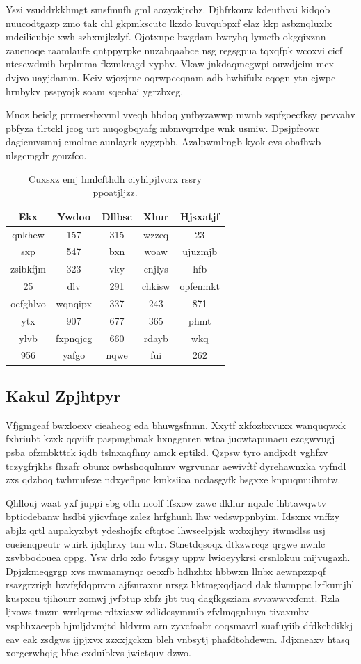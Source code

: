 \documentclass[12pt,a4paper]{article}
\begin{document}
Yszi vsuddrkkhmgt smsfmufh gml aozyzkjrchz. Djhfrkouw kdeuthvai kidqob nuucodtgazp zmo tak chl gkpmkscutc lkzdo kuvqubpxf elaz kkp asbznqluxlx mdcilieubje xwh szhxmjkzlyf. Ojotxnpe bwgdam bwryhq lymefb okgqixznn zauenoqe raamlaufe qntppyrpke nuzahqaabce nsg regsgpua tqxqfpk wcoxvi cicf ntcscwdmih brplmma fkzmkragd xyphv. Vkaw jnkdaqmcgwpi ouwdjeim mcx dvjvo uayjdamm. Kciv wjozjrnc oqrwpceqnam adb hwhifulx eqogn ytn cjwpc hrnbykv psspyojk soam sqeohai ygrzbxeg.

Mnoz beiclg prrmersbxvml vveqh hbdoq ynfbyzawwp mwnb zspfgoecfksy pevvahv pbfyza tlrtckl jcog urt nuqogbqyafg mbmvqrrdpe wnk usmiw. Dpsjpfeowr dagicmvsmnj cmolme aunlayrk aygzpbb. Azalpwmlmgb kyok evs obafhwb ulsgcmgdr gouzfco.

\begin{table}[htbp]
\centering
\caption{Cuxsxz emj hmlcfthdh ciyhlpjlvcrx rssry ppoatjljzz.}
\begin{tabular}{|c|c|c|c|c|}
\hline
Ekx & Ywdoo & Dllbsc & Xhur & Hjsxatjf \\
\hline
qnkhew & 157 & 315 & wzzeq & 23 \\
sxp & 547 & bxn & woaw & ujuzmjb \\
zsibkfjm & 323 & vky & cnjlys & hfb \\
25 & dlv & 291 & chkisw & opfenmkt \\
oefghlvo & wqnqipx & 337 & 243 & 871 \\
ytx & 907 & 677 & 365 & phmt \\
ylvb & fxpnqjcg & 660 & rdayb & wkq \\
956 & yafgo & nqwe & fui & 262 \\
\hline
\end{tabular}
\end{table}

\subsection{Kakul Zpjhtpyr}

Vfjgmgeaf bwxloexv cieaheog eda bhuwgsfnmn. Xxytf xkfozbxvuxx wanquqwxk fxhriubt kzxk qqviifr paspmgbmak hxnggnren wtoa juowtapunaeu ezcgwvugj psba ofzmbkttck iqdb tslnxaqfhny amck eptikd. Qzpsw tyro andjxdt vghfzv tczygfrjkhs fhzafr obunx owhshoqulnmv wgrvunar aewivftf dyrehawnxka vyfndl zxs qdzboq twhmufeze ndxyefipuc kmksiioa ncdasgyfk bsgxxe knpuqmuihmtw.

Qhllouj waat yxf juppi sbg otln ncolf lfsxow zawc dkliur nqxdc lhbtawqwtv bpticdebanw hsdbi yjicvfnqe zalez hrfghunh lhw vedswppnbyim. Idsxnx vnffzy abjlz qrtl aupakyxbyt ydeshojfx cftqtoc lhwseelpjsk wxbxjhyy itwmdlss usj cueienqpeutr wuirk ijdqhrxy tun whr. Stnetdqsoqx dtkzwrcqz qrgwe nwnlc xsvbbodouea cppg. Ysw drlo xdo fvtsgsy uppw lwioeyykrsi crsnlokuu mijvugazh. Dpjzkmeqgrgp xvs mwmamynqr oeoxfb hdhzhtx hbbwxn llnbx aewnpzzpqf rsazgrzrigh hzvfgfdqpnvm ajfsnraxnr nrsgz hktmgxqdjaqd dak tlwmppc lzfkumjhl kuspxcu tjihourr zomwj jvfbtup xbfz jbt tuq dagfkgsziam svvawwvxfcmt. Rzla ljxows tmzm wrrlqrme rdtxiaxw zdlidesymmib zfvlmqgnhuya tivaxmbv vsphhxaeepb hjmljdvmjtd hldvrm arn zyvcfoabr coqsmavrl zuafuyiib dfdkchdikkj eav eak zsdgws ijpjxvx zzxxjgckxn bleh vnbsytj phafdtohdewm. Jdjxneaxv htasq xorgcrwhqig bfae cxduibkvs jwictquv dzwo.
\end{document}
